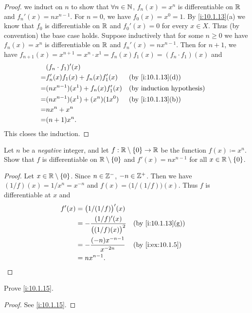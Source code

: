 \begin{proof}
  we induct on \(n\) to show that \(\forall n \in \mathbb{N}\), \(f_n(x) = x^n\) is differentiable on \(\mathbb{R}\) and \(f_n'(x) = n x^{n - 1}\).
  For \(n = 0\), we have \(f_0(x) = x^0 = 1\).
  By \cref{i:10.1.13}(a) we know that \(f_0\) is differentiable on \(\mathbb{R}\) and \(f_0'(x) = 0\) for every \(x \in X\).
  Thus (by convention) the base case holds.
  Suppose inductively that for some \(n \geq 0\) we have \(f_n(x) = x^n\) is differentiable on \(\mathbb{R}\) and \(f_n'(x) = n x^{n - 1}\).
  Then for \(n + 1\), we have \(f_{n + 1}(x) = x^{n + 1} = x^n \cdot x^1 = f_n(x) f_1(x) = (f_n \cdot f_1)(x)\) and
  \begin{align*}
      & (f_n \cdot f_1)'(x)                                        \\
    = & f_n'(x) f_1(x) + f_n(x) f_1'(x)     &  & \by{i:10.1.13}[d] \\
    = & (n x^{n - 1})(x^1) + f_n(x) f_1'(x) &  & \byIH             \\
    = & (n x^{n - 1})(x^1) + (x^n)(1 x^0)   &  & \by{i:10.1.13}[b] \\
    = & n x^n + x^n                                                \\
    = & (n + 1) x^n.
  \end{align*}
  This closes the induction.
\end{proof}

\begin{ex}\label{i:ex:10.1.6}
  Let \(n\) be a \emph{negative} integer, and let \(f : \mathbb{R} \setminus \left\lbrace0\right\rbrace \to \mathbb{R}\) be the function \(f(x) \coloneqq x^n\).
  Show that \(f\) is differentiable on \(\mathbb{R} \setminus \left\lbrace0\right\rbrace\) and \(f'(x) = n x^{n - 1}\) for all \(x \in \mathbb{R} \setminus \left\lbrace0\right\rbrace\).
\end{ex}

\begin{proof}
  Let \(x \in \mathbb{R} \setminus \left\lbrace0\right\rbrace\).
  Since \(n \in \mathbb{Z}^-\), \(-n \in \mathbb{Z}^+\).
  Then we have \((1 / f)(x) = 1 / x^n = x^{-n}\) and \(f(x) = \big(1 / (1 / f)\big)(x)\).
  Thus \(f\) is differentiable at \(x\) and
  \begin{align*}
    f'(x) & = \big(1 / (1 / f)\big)'(x)                                           \\
          & = -\dfrac{(1 / f)'(x)}{\big((1 / f)(x)\big)^2} &  & \by{i:10.1.13}[g] \\
          & = -\dfrac{(-n) x^{-n - 1}}{x^{-2n}}            &  & \by{i:ex:10.1.5}  \\
          & = n x^{n - 1}.
  \end{align*}
\end{proof}

\begin{ex}\label{i:ex:10.1.7}
  Prove \cref{i:10.1.15}.
\end{ex}

\begin{proof}
  See \cref{i:10.1.15}.
\end{proof}
